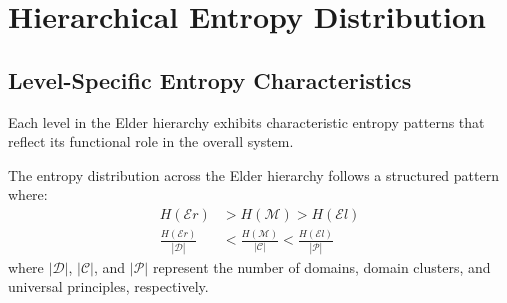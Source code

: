 \section{Hierarchical Entropy Distribution}

\subsection{Level-Specific Entropy Characteristics}

Each level in the Elder hierarchy exhibits characteristic entropy patterns that reflect its functional role in the overall system.

\begin{theorem}
The entropy distribution across the Elder hierarchy follows a structured pattern where:
\begin{align}
H(\mathcal{E}r) &> H(\mathcal{M}) > H(\mathcal{E}l) \\
\frac{H(\mathcal{E}r)}{|\mathcal{D}|} &< \frac{H(\mathcal{M})}{|\mathcal{C}|} < \frac{H(\mathcal{E}l)}{|\mathcal{P}|}
\end{align}
where $|\mathcal{D}|$, $|\mathcal{C}|$, and $|\mathcal{P}|$ represent the number of domains, domain clusters, and universal principles, respectively.
\end{theorem}

